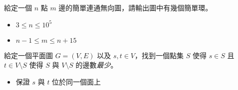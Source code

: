 \documentclass[standalone]{beamer}
\begin{document}
\begin{frame}{}
  \begin{problem}
    給定一個 $n$ 點 $m$ 邊的簡單連通無向圖，請輸出圖中有幾個簡單環。

    \begin{itemize}
      \item $3 \leq n \leq 10^5$
      \item $n - 1 \leq m \leq n + 15$
    \end{itemize}
  \end{problem}
\end{frame}

\begin{frame}{}
   {
    \begin{problem}
      給定一個平面圖 $G = (V, E)$ 以及 $s, t \in V$，找到一個點集 $S$ 使得 $s \in S$ 且 $t \in V \setminus S$ 使得 $S$ 與 $V \setminus S$ 的邊數\emph{最少}。

      \begin{itemize}
        \item 保證 $s$ 與 $t$ 位於同一個面上
      \end{itemize}
    \end{problem}
  }
   {
    \begin{figure}
    \end{figure}
  }
\end{frame}
\end{document}
